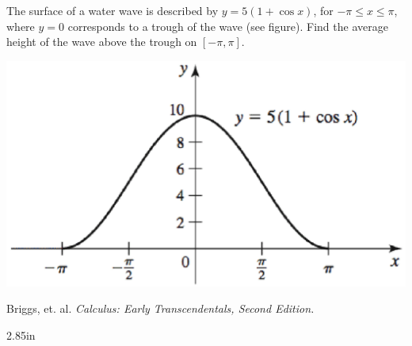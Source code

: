 \documentclass[12pt, addpoints]{exam}
\newcommand{\vstr}{\vspace{\stretch{1}}}
\theoremstyle{plain}
\begin{document}
\begin{questions}
\question[10] The surface of a water wave is described by $y=5(1+\cos x)$, for $-\pi\leq x\leq \pi$, where $y=0$ corresponds to a trough of the wave (see figure).  Find the average height of the wave above the trough on $[-\pi,\pi]$.
\vspace{-0.5pc}
\begin{center}
\includegraphics[scale=0.4]{exam4Sec5p4}

{\footnotesize Briggs, et. al. \emph{Calculus: Early Transcendentals, Second Edition.}}
\end{center}
\vspace
{2.85in}




\end{questions}
\end{document}
